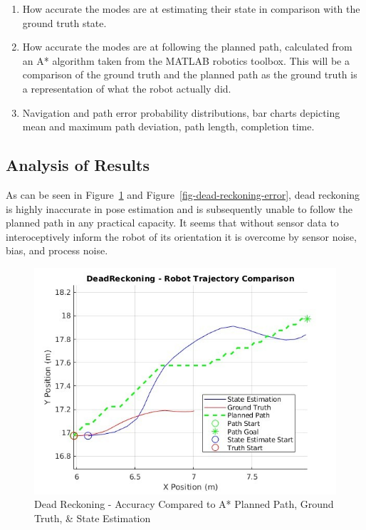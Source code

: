\documentclass[
  letterpaper,
  DIV=11,
  numbers=noendperiod]{scrartcl}
\begin{document}
\begin{enumerate}
\def\labelenumi{\arabic{enumi}.}
\item
  How accurate the modes are at estimating their state in comparison
  with the ground truth state.
\item
  How accurate the modes are at following the planned path, calculated
  from an A* algorithm taken from the MATLAB robotics toolbox. This will
  be a comparison of the ground truth and the planned path as the ground
  truth is a representation of what the robot actually did.
\item
  Navigation and path error probability distributions, bar charts
  depicting mean and maximum path deviation, path length, completion
  time.
\end{enumerate}

\hypertarget{analysis-of-results}{%
\subsection{Analysis of Results}\label{analysis-of-results}}

As can be seen in Figure~\ref{fig-dead-reckoning-trajectory} and
Figure~\ref{fig-dead-reckoning-error}, dead reckoning is highly
inaccurate in pose estimation and is subsequently unable to follow the
planned path in any practical capacity. It seems that without sensor
data to interoceptively inform the robot of its orientation it is
overcome by sensor noise, bias, and process noise.

\begin{figure}

{\centering \includegraphics{dead-reckoning-trajectory.png}

}

\caption{\label{fig-dead-reckoning-trajectory}Dead Reckoning - Accuracy
Compared to A* Planned Path, Ground Truth, \& State Estimation}

\end{figure}
\end{document}
